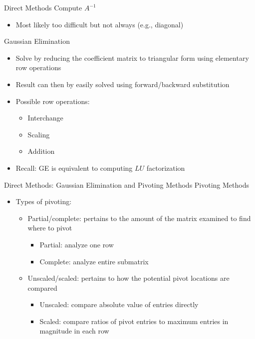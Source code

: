 \documentclass[9pt, serif]{beamer}
\newlength{\wideitemsep}
\let\olditem\item
\renewcommand{\item}{\setlength{\itemsep}{\wideitemsep}\olditem}
\newcommand{\bi}{\begin{itemize}}
\newcommand{\ei}{\end{itemize}}
\begin{document}
\begin{frame}{Direct Methods}
    \pause
    Compute $A^{-1}$ \pause
    \bi
        \item Most likely too difficult but not always (e.g., diagonal) \pause
    \ei
    Gaussian Elimination \pause
    \bi
        \item Solve by reducing the coefficient matrix to triangular form using elementary row operations \pause
        \item Result can then by easily solved using forward/backward substitution \pause
        \item Possible row operations:
        \bi
            \item Interchange
            \item Scaling
            \item Addition \pause
        \ei 
        \item Recall: GE is equivalent to computing $LU$ factorization
    \ei
\end{frame}


\begin{frame}{Direct Methods: Gaussian Elimination and Pivoting Methods}
    Pivoting Methods \pause
    \bi
        \item Types of pivoting:
        \bi
            \item Partial/complete: pertains to the amount of the matrix examined to find where to pivot \pause
            \bi
                \item Partial: analyze one row
                \item Complete: analyze entire submatrix
            \ei \pause
            \item Unscaled/scaled: pertains to how the potential pivot locations are compared \pause
            \bi
                \item Unscaled: compare absolute value of entries directly
                \item Scaled: compare ratios of pivot entries to maximum entries in magnitude in each row
            \ei
        \ei
    \ei
\end{frame}
\end{document}
